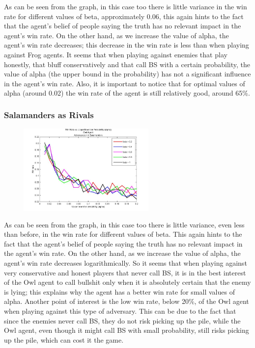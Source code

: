 \documentclass[a4paper,11pt]{article}
\begin{document}
As can be seen from the graph, in this case too there is little variance in the win rate for different values of beta, approximately 0.06, this again hints to the fact that the agent’s belief of people saying the truth has no relevant impact in the agent’s win rate. On the other hand, as we increase the value of alpha, the agent’s win rate decreases; this decrease in the win rate is less than when playing against Frog agents. It seems that when playing against enemies that play honestly, that bluff conservatively and that call BS with a certain probability, the value of alpha (the upper bound in the probability) has not a significant influence in the agent’s win rate.  Also, it is important to notice that for optimal values of alpha (around 0.02) the win rate of the agent is still relatively good, around 65\%.


\subsubsection{Salamanders as Rivals}

\begin{figure}
\includegraphics[width=0.6\textwidth]{owl_vs_salamander_upperbBoundProb}
\caption{}
\end{figure}

As can be seen from the graph, in this case too there is little variance, even less than before, in the win rate for different values of beta. This again hints to the fact that the agent’s belief of people saying the truth has no relevant impact in the agent’s win rate. On the other hand, as we increase the value of alpha, the agent’s win rate decreases logarithmically. So it seems that when playing against very conservative and honest players that never call BS, it is in the best interest of the Owl agent to call bullshit only when it is absolutely certain that the enemy is lying; this explains why the agent has a better win rate for small values of alpha. Another point of interest is the low win rate, below 20\%,  of the Owl agent when playing against this type of adversary. This can be due to the fact that since the enemies never call BS, they do not risk picking up the pile, while the Owl agent, even though it might call BS with small probability, still risks picking up the pile, which can cost it the game. 
\end{document}
